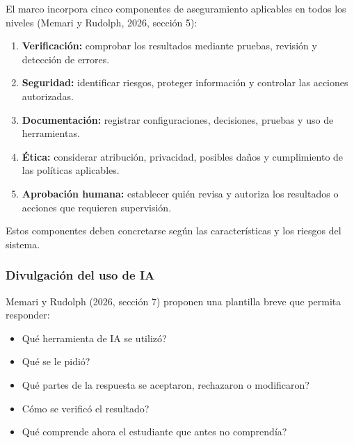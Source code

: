 El marco incorpora cinco componentes de aseguramiento aplicables en todos los niveles (Memari y Rudolph, 2026, sección 5): %

\begin{enumerate}
    \item \textbf{Verificación:} comprobar los resultados mediante pruebas, revisión y detección de errores. %
    \item \textbf{Seguridad:} identificar riesgos, proteger información y controlar las acciones autorizadas. %
    \item \textbf{Documentación:} registrar configuraciones, decisiones, pruebas y uso de herramientas. %
    \item \textbf{Ética:} considerar atribución, privacidad, posibles daños y cumplimiento de las políticas aplicables. %
    \item \textbf{Aprobación humana:} establecer quién revisa y autoriza los resultados o acciones que requieren supervisión. %
\end{enumerate}

Estos componentes deben concretarse según las características y los riesgos del sistema. %

\subsubsection*{Divulgación del uso de IA} %

Memari y Rudolph (2026, sección 7) proponen una plantilla breve que permita responder: %

\begin{itemize}
    \item \textquestiondown Qué herramienta de IA se utilizó? %
    \item \textquestiondown Qué se le pidió? %
    \item \textquestiondown Qué partes de la respuesta se aceptaron, rechazaron o modificaron? %
    \item \textquestiondown Cómo se verificó el resultado? %
    \item \textquestiondown Qué comprende ahora el estudiante que antes no comprendía? %
\end{itemize}

